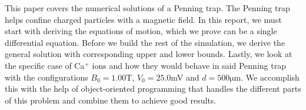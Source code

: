 This paper covers the numerical solutions of a Penning trap. The Penning trap
helps confine charged particles with a magnetic field. In this report, we must
start with deriving the equations of motion, which we prove can be
a single differential equation.
Before we build the rest of the simulation, we derive the general solution with
corresponding upper and lower bounds.
Lastly, we look at the specific case of Ca$^+$ ions and how they would behave in
said Penning trap with the configurations $B_0 = 1.00$T, $V_0 = 25.0$mV and
$d = 500\si{\micro\meter}$.
We accomplish this with the help of object-oriented programming that handles the
different parts of this problem and combine them to achieve good results.
